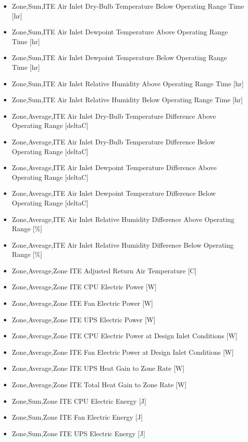 \begin{itemize}
\item
  Zone,Sum,ITE Air Inlet Dry-Bulb Temperature Below Operating Range Time {[}hr{]}
\item
  Zone,Sum,ITE Air Inlet Dewpoint Temperature Above Operating Range Time {[}hr{]}
\item
  Zone,Sum,ITE Air Inlet Dewpoint Temperature Below Operating Range Time {[}hr{]}
\item
  Zone,Sum,ITE Air Inlet Relative Humidity Above Operating Range Time {[}hr{]}
\item
  Zone,Sum,ITE Air Inlet Relative Humidity Below Operating Range Time {[}hr{]}
\item
  Zone,Average,ITE Air Inlet Dry-Bulb Temperature Difference Above Operating Range {[}deltaC{]}
\item
  Zone,Average,ITE Air Inlet Dry-Bulb Temperature Difference Below Operating Range {[}deltaC{]}
\item
  Zone,Average,ITE Air Inlet Dewpoint Temperature Difference Above Operating Range {[}deltaC{]}
\item
  Zone,Average,ITE Air Inlet Dewpoint Temperature Difference Below Operating Range {[}deltaC{]}
\item
  Zone,Average,ITE Air Inlet Relative Humidity Difference Above Operating Range {[}\%{]}
\item
  Zone,Average,ITE Air Inlet Relative Humidity Difference Below Operating Range {[}\%{]}
\item
  Zone,Average,Zone ITE Adjusted Return Air Temperature {[}C{]}
\item
  Zone,Average,Zone ITE CPU Electric Power {[}W{]}
\item
  Zone,Average,Zone ITE Fan Electric Power {[}W{]}
\item
  Zone,Average,Zone ITE UPS Electric Power {[}W{]}
\item
  Zone,Average,Zone ITE CPU Electric Power at Design Inlet Conditions {[}W{]}
\item
  Zone,Average,Zone ITE Fan Electric Power at Design Inlet Conditions {[}W{]}
\item
  Zone,Average,Zone ITE UPS Heat Gain to Zone Rate {[}W{]}
\item
  Zone,Average,Zone ITE Total Heat Gain to Zone Rate {[}W{]}
\item
  Zone,Sum,Zone ITE CPU Electric Energy {[}J{]}
\item
  Zone,Sum,Zone ITE Fan Electric Energy {[}J{]}
\item
  Zone,Sum,Zone ITE UPS Electric Energy {[}J{]}

\end{itemize}
